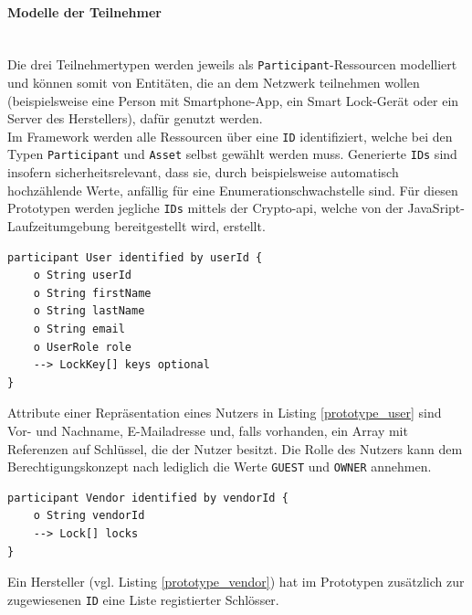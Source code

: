        \paragraph{\textrm{Modelle der Teilnehmer}}\hspace{0cm}\\
            Die drei Teilnehmertypen werden jeweils als \colorbox{light-gray}{\lstinline{Participant}}-Ressourcen modelliert und können somit von Entitäten, die an dem Netzwerk teilnehmen wollen (beispielsweise eine Person mit Smartphone-App, ein Smart Lock-Gerät oder ein Server des Herstellers), dafür genutzt werden. 
            \medskip\\
            Im Framework werden alle Ressourcen über eine \colorbox{light-gray}{\lstinline{ID}} identifiziert, welche bei den Typen \colorbox{light-gray}{\lstinline{Participant}} und \colorbox{light-gray}{\lstinline{Asset}} selbst gewählt werden muss. 
            Generierte \colorbox{light-gray}{\lstinline{IDs}} sind insofern sicherheitsrelevant, dass sie, durch beispielsweise automatisch hochzählende Werte, anfällig für eine Enumerationschwachstelle sind. 
            Für diesen Prototypen werden jegliche \colorbox{light-gray}{\lstinline{IDs}} mittels der Crypto-\gls{api}, welche von der JavaSript-Laufzeitumgebung bereitgestellt wird, erstellt.
            \medskip
            \begin{lstlisting}[caption={Repräsantation eines Nutzers},label=prototype_user,captionpos=b]
participant User identified by userId {
    o String userId
    o String firstName
    o String lastName
    o String email
    o UserRole role
    --> LockKey[] keys optional
}
            \end{lstlisting}
            \noindent Attribute einer Repräsentation eines Nutzers in Listing \ref{prototype_user} sind Vor- und Nachname, E-Mailadresse und, falls vorhanden, ein Array mit Referenzen auf Schlüssel, die der Nutzer besitzt. 
            Die Rolle des Nutzers kann dem Berechtigungskonzept nach lediglich die Werte \colorbox{light-gray}{\lstinline{GUEST}} und \colorbox{light-gray}{\lstinline{OWNER}} annehmen. 
            \medskip
            \begin{lstlisting}[caption={Repräsantation eines Herstellers},label=prototype_vendor,captionpos=b]
participant Vendor identified by vendorId {
    o String vendorId
    --> Lock[] locks
}
            \end{lstlisting}
            Ein Hersteller (vgl. Listing \ref{prototype_vendor}) hat im Prototypen zusätzlich zur zugewiesenen \colorbox{light-gray}{\lstinline{ID}} eine Liste registierter Schlösser.
